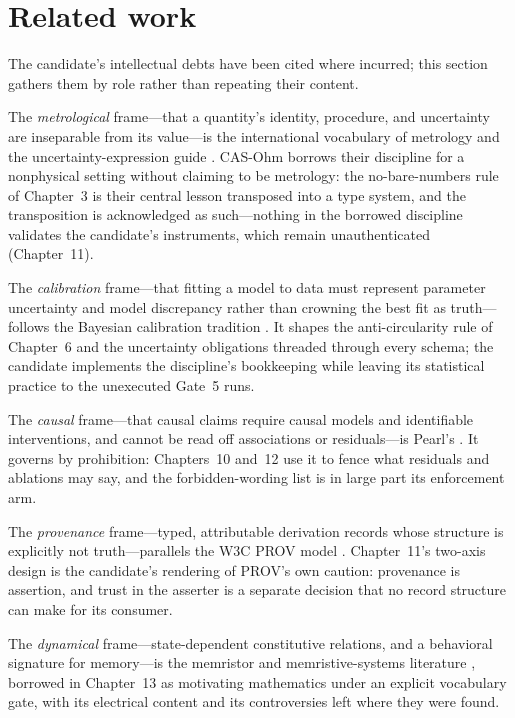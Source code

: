 \section{Related work}\label{evid:sec:related}

The candidate's intellectual debts have been cited where incurred; this section gathers them by role rather than repeating their content.

The \emph{metrological} frame---that a quantity's identity, procedure, and uncertainty are inseparable from its value---is the international vocabulary of metrology and the uncertainty-expression guide \cite{vim,gum}. CAS-Ohm borrows their discipline for a nonphysical setting without claiming to be metrology: the no-bare-numbers rule of Chapter~3 is their central lesson transposed into a type system, and the transposition is acknowledged as such---nothing in the borrowed discipline validates the candidate's instruments, which remain unauthenticated (Chapter~11).

The \emph{calibration} frame---that fitting a model to data must represent parameter uncertainty and model discrepancy rather than crowning the best fit as truth---follows the Bayesian calibration tradition \cite{kennedyohagan}. It shapes the anti-circularity rule of Chapter~6 and the uncertainty obligations threaded through every schema; the candidate implements the discipline's bookkeeping while leaving its statistical practice to the unexecuted Gate~5 runs.

The \emph{causal} frame---that causal claims require causal models and identifiable interventions, and cannot be read off associations or residuals---is Pearl's \cite{pearl}. It governs by prohibition: Chapters~10 and~12 use it to fence what residuals and ablations may say, and the forbidden-wording list is in large part its enforcement arm.

The \emph{provenance} frame---typed, attributable derivation records whose structure is explicitly not truth---parallels the W3C PROV model \cite{prov}. Chapter~11's two-axis design is the candidate's rendering of PROV's own caution: provenance is assertion, and trust in the asserter is a separate decision that no record structure can make for its consumer.

The \emph{dynamical} frame---state-dependent constitutive relations, and a behavioral signature for memory---is the memristor and memristive-systems literature \cite{chua71,chuakang76}, borrowed in Chapter~13 as motivating mathematics under an explicit vocabulary gate, with its electrical content and its controversies left where they were found.

